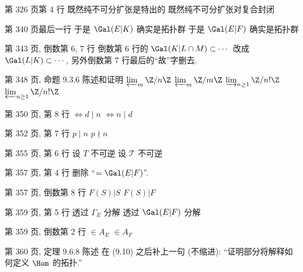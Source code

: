 \documentclass{AJerrata}
\begin{document}
\begin{Errata}
        \item[第 326 页第 4 行]
        \Orig 既然纯不可分扩张是特出的
        \Corr 既然纯不可分扩张对复合封闭
        
        \item[第 340 页最后一行]
        \Orig 于是 $\Gal(E|K)$ 确实是拓扑群
        \Corr 于是 $\Gal(E|F)$ 确实是拓扑群
        
        \item[第 343 页, 倒数第 6, 7 行]
        倒数第 6 行的 $\Gal(K | L \cap M) \subset \cdots$ 改成 $\Gal(L|K) \subset \cdots$, 另外倒数第 7 行最后的``故''字删去.
        
   		\item[第 348 页, 命题 9.3.6 陈述和证明]
        \Orig $\varprojlim_m \Z/n\Z$
        \Corr $\varprojlim_m \Z/m\Z$
        \newline
        \Orig $\varinjlim_{n \geq 1} \Z/n!\Z$
        \Corr $\varprojlim_{n \geq 1} \Z/n!\Z$
        
        \item[第 350 页, 第 8 行]
        \Orig $\iff d \mid n$
        \Corr $\iff n \mid d$
        
   		\item[第 352 页, 第 7 行]
        \Orig $p \mid n$
        \Corr $p \nmid n$
        
        \item[第 355 页, 第 6 行]
        \Orig 设 $T$ 不可逆
        \Corr 设 $\mathcal{T}$ 不可逆
        
        \item[第 357 页, 第 4 行]
        删除 ``$= \Gal(E|F)$''.
        
        \item[第 357 页, 倒数第 8 行]
        \Orig $F(S)|S$
        \Corr $F(S)|F$
        
        \item[第 359 页, 第 5 行]
        \Orig 透过 $\Gamma_E$ 分解
        \Corr 透过 $\Gal(E|F)$ 分解
        
        \item[第 359 页, 倒数第 2 行]
        \Orig $\in A_E$
        \Corr $\in A_F$
        
        \item[第 360 页, 定理 9.6.8 陈述]
        在 (9.10) 之后补上一句 (不缩进): ``证明部分将解释如何定义 $\Hom$ 的拓扑.'' 
        

\end{Errata}
\end{document}
